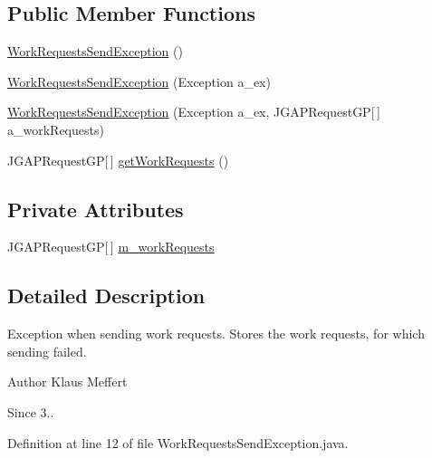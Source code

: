 \subsection*{Public Member Functions}
\begin{DoxyCompactItemize}
\item 
\hyperlink{classorg_1_1jgap_1_1distr_1_1grid_1_1common_1_1_work_requests_send_exception_affbdde06c48e307f6cd72a4b2988a58c}{Work\-Requests\-Send\-Exception} ()
\item 
\hyperlink{classorg_1_1jgap_1_1distr_1_1grid_1_1common_1_1_work_requests_send_exception_a9ec9f4e472d13eec20b3a2b7363446f4}{Work\-Requests\-Send\-Exception} (Exception a\-\_\-ex)
\item 
\hyperlink{classorg_1_1jgap_1_1distr_1_1grid_1_1common_1_1_work_requests_send_exception_a8cde36ca205d40986f0faaf1198d105f}{Work\-Requests\-Send\-Exception} (Exception a\-\_\-ex, J\-G\-A\-P\-Request\-G\-P\mbox{[}$\,$\mbox{]} a\-\_\-work\-Requests)
\item 
J\-G\-A\-P\-Request\-G\-P\mbox{[}$\,$\mbox{]} \hyperlink{classorg_1_1jgap_1_1distr_1_1grid_1_1common_1_1_work_requests_send_exception_a06419f78f68c6dd9bc58e9ab3888b0f2}{get\-Work\-Requests} ()
\end{DoxyCompactItemize}
\subsection*{Private Attributes}
\begin{DoxyCompactItemize}
\item 
J\-G\-A\-P\-Request\-G\-P\mbox{[}$\,$\mbox{]} \hyperlink{classorg_1_1jgap_1_1distr_1_1grid_1_1common_1_1_work_requests_send_exception_afa585471e19bd3fe71486c745b04fd8d}{m\-\_\-work\-Requests}
\end{DoxyCompactItemize}


\subsection{Detailed Description}
Exception when sending work requests. Stores the work requests, for which sending failed.

\begin{DoxyAuthor}{Author}
Klaus Meffert 
\end{DoxyAuthor}
\begin{DoxySince}{Since}
3.. 
\end{DoxySince}


Definition at line 12 of file Work\-Requests\-Send\-Exception.\-java.



